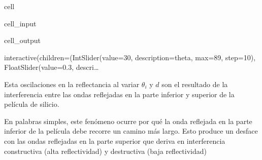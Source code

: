 \documentclass[letterpaper,10pt,english]{jupyterBook}
\let\sphinxpxdimen\pdfpxdimen\else\newdimen\sphinxpxdimen
\begin{document}
\begin{sphinxuseclass}{cell}\begin{sphinxVerbatimInput}

\begin{sphinxuseclass}{cell_input}
\begin{sphinxVerbatim}[commandchars=\\\{\}]
   

 
  
     
\end{sphinxVerbatim}

\end{sphinxuseclass}\end{sphinxVerbatimInput}
\begin{sphinxVerbatimOutput}

\begin{sphinxuseclass}{cell_output}
\begin{sphinxVerbatim}[commandchars=\\\{\}]
interactive(children=(IntSlider(value=30, description=\PYGZsq{}theta\PYGZsq{}, max=89, step=10), FloatSlider(value=0.3, descri…
\end{sphinxVerbatim}

\end{sphinxuseclass}\end{sphinxVerbatimOutput}

\end{sphinxuseclass}
\sphinxAtStartPar
Esta oscilaciones en la reflectancia al variar \(\theta_i\) y \(d\) son el resultado de la interferencia entre las ondas reflejadas en la parte inferior y superior de la película de silicio.

\noindent{\hspace*{\fill}\sphinxincludegraphics[width=350\sphinxpxdimen]{{interference}.png}\hspace*{\fill}}

\sphinxAtStartPar
En palabras simples, este fenómeno ocurre por qué la onda reflejada en la parte inferior de la película debe recorre un camino más largo. Esto produce un desface con las ondas reflejadas en la parte superior que deriva en interferencia constructiva (alta reflectividad) y destructiva (baja reflectividad)
\end{document}
